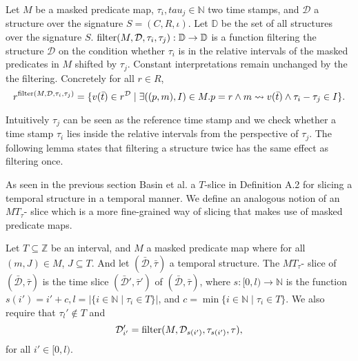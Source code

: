 \begin{definition}
    \label{def:filter}
    Let $M$ be a masked predicate map, $\tau_i, tau_j \in \mathbb{N}$ two time stamps, and $\mathcal{D}$ a structure over the signature $S = (C,R,\iota)$.
    Let $\mathbb{D}$ be the set of all structures over the signature $S$.
    $\operatorname{filter}(M, \mathcal{D}, \tau_i, \tau_j) : \mathbb{D} \to \mathbb{D}$ is a function filtering the structure $\mathcal{D}$ on the condition whether $\tau_i$ is in the relative intervals of the masked predicates in $M$ shifted by $\tau_j$.
    Constant interpretations remain unchanged by the the filtering.
    Concretely for all $r \in R$, 
    \begin{equation*}
        r^{\operatorname{filter}(M, \mathcal{D}, \tau_i, \tau_j)} 
        = \{v(\bar{t}) \in r^{\mathcal{D}} \mid 
            \exists ((p,m), I) \in M. 
                p = r \land m \rightsquigarrow v(\bar{t}) 
                \land \tau_i - 
                \tau_j \in I \}.
    \end{equation*}
\end{definition}
Intuitively $\tau_j$ can be seen as the reference time stamp and we check whether a time stamp $\tau_i$ lies inside the relative intervals from the perspective of $\tau_j$.
The following lemma states that filtering a structure twice has the same effect as filtering once.



As seen in the previous section Basin et al. \cite{Basin2016} a $T$-slice in Definition A.2 for slicing a temporal structure in a temporal manner.
We define an analogous notion of an $MT_{\tau}$- slice which is a more fine-grained way of slicing that makes use of masked predicate maps.
\begin{definition}
    \label{def:mt-slice}
    Let $T \subseteq \mathbb{Z}$ be an interval,
        and $M$ a masked predicate map
            where for all $(m, J) \in M$, $J \subseteq T$.
    And let $(\bar{\mathcal{D}}, \bar{\tau})$ a temporal structure.
    The $MT_{\tau}$- slice of $(\bar{\mathcal{D}}, \bar{\tau})$ is the time slice $(\bar{\mathcal{D}}', \bar{\tau}')$ of $(\bar{\mathcal{D}}, \bar{\tau})$, where $s:[0,l) \to \mathbb{N}$ is the function $s(i') = i' + c, l = |\{i \in \mathbb{N} \mid \tau_i \in T\}|$, and $c = \min\{i \in \mathbb{N} \mid \tau_i \in T \}$. 
    We also require that $\tau_l' \not\in T$ and 
    \begin{equation*}
        \mathcal{D}'_{i'} = \operatorname{filter}(M, \mathcal{D}_{s(i')}, \tau_{s(i')}, \tau),
    \end{equation*}
    for all $i' \in [0,l)$.
\end{definition}


